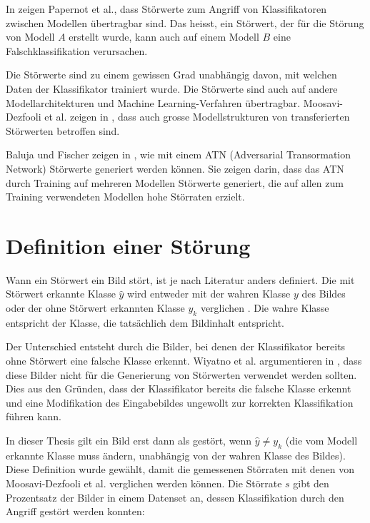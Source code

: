\documentclass{FFHS_Thesis_Additions/ffhsthesis}
\begin{document}
In \cite{papernot_transferability_2016} zeigen Papernot et al., dass Störwerte zum Angriff von Klassifikatoren zwischen Modellen übertragbar sind. Das heisst, ein Störwert, der für die Störung von Modell $A$ erstellt wurde, kann auch auf einem Modell $B$ eine Falschklassifikation verursachen.



Die Störwerte sind zu einem gewissen Grad unabhängig davon, mit welchen Daten der Klassifikator trainiert wurde. 
Die Störwerte sind auch auf andere Modellarchitekturen und Machine Learning-Verfahren übertragbar. Moosavi-Dezfooli et al. zeigen in \cite{moosavi-dezfooli_universal_2017-1}, dass auch grosse Modellstrukturen von transferierten Störwerten betroffen sind.

Baluja und Fischer zeigen in \cite{baluja_adversarial_2017}, wie mit einem ATN (Adversarial Transormation Network) Störwerte generiert werden können. Sie zeigen darin, dass das ATN durch Training auf mehreren Modellen Störwerte generiert, die auf allen zum Training verwendeten Modellen hohe Störraten erzielt.


\section{Definition einer Störung}

Wann ein Störwert ein Bild stört, ist je nach Literatur anders definiert. 
Die mit Störwert erkannte Klasse $\hat{y}$ wird entweder mit der wahren Klasse $y$ des Bildes oder der ohne Störwert erkannten Klasse $y_k$ verglichen \cite{moosavi-dezfooli_deepfool_2016, wiyatno_adversarial_2019}. 
Die wahre Klasse entspricht der Klasse, die tatsächlich dem Bildinhalt entspricht.

Der Unterschied entsteht durch die Bilder, bei denen der Klassifikator bereits ohne Störwert eine falsche Klasse erkennt. 
Wiyatno et al. argumentieren in \cite{wiyatno_adversarial_2019}, dass diese Bilder nicht für die Generierung von Störwerten verwendet werden sollten. 
Dies aus den Gründen, dass der Klassifikator bereits die falsche Klasse erkennt und eine Modifikation des Eingabebildes ungewollt zur korrekten Klassifikation führen kann.

In dieser Thesis gilt ein Bild erst dann als gestört, wenn $\hat{y} \neq y_k$ (die vom Modell erkannte Klasse muss ändern, unabhängig von der wahren Klasse des Bildes). 
Diese Definition wurde gewählt, damit die gemessenen Störraten mit denen von Moosavi-Dezfooli et al. verglichen werden können. Die Störrate $s$ gibt den Prozentsatz der Bilder in einem Datenset an, dessen Klassifikation durch den Angriff gestört werden konnten:
\end{document}
